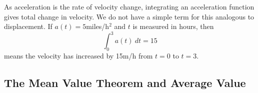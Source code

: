 
As acceleration is the rate of velocity change, integrating an acceleration function gives total change in velocity. We do not have a simple term for this analogous to displacement. If $a(t) = 5$miles/h$^2$ and $t$ is measured in hours, then 
\[\int_0^3 a(t)\ dt = 15\]
means the velocity has increased by 15m/h from $t=0$ to $t=3$.

\subsection{The Mean Value Theorem and Average Value}

